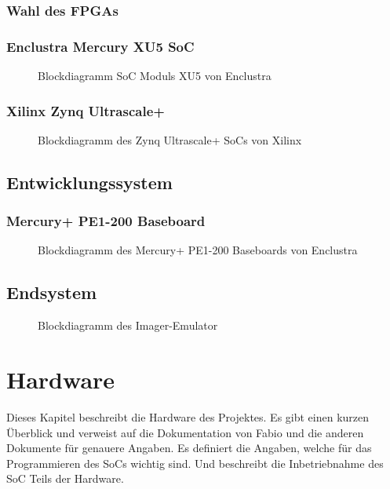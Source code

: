 \documentclass{article}
\begin{document}
\subsubsection*{Wahl des FPGAs}

\subsubsection*{Enclustra Mercury XU5 SoC}
\begin{figure}[tb]
    \caption{Blockdiagramm SoC Moduls XU5 von Enclustra}
    \label{fig:bd_xu5}
\end{figure}

\subsubsection*{Xilinx Zynq Ultrascale+}
\begin{figure}[tb]
    \caption{Blockdiagramm des Zynq Ultrascale+ SoCs von Xilinx}
    \label{fig:bd_soc}
\end{figure}

\subsection{Entwicklungssystem}

\subsubsection*{Mercury+ PE1-200 Baseboard}
\begin{figure}[tb]
    \caption{Blockdiagramm des Mercury+ PE1-200 Baseboards von Enclustra}
    \label{fig:bd_pe1}
\end{figure}

\subsection{Endsystem}
\begin{figure}[tb]
    \caption{Blockdiagramm des Imager-Emulator}
    \label{fig:bd_top}
\end{figure}

\section{Hardware}
Dieses Kapitel beschreibt die Hardware des Projektes. Es gibt einen kurzen Überblick und verweist auf die Dokumentation von Fabio und die anderen Dokumente für genauere Angaben. Es definiert die Angaben, welche für das Programmieren des SoCs wichtig sind. Und beschreibt die Inbetriebnahme des SoC Teils der Hardware.
\end{document}
